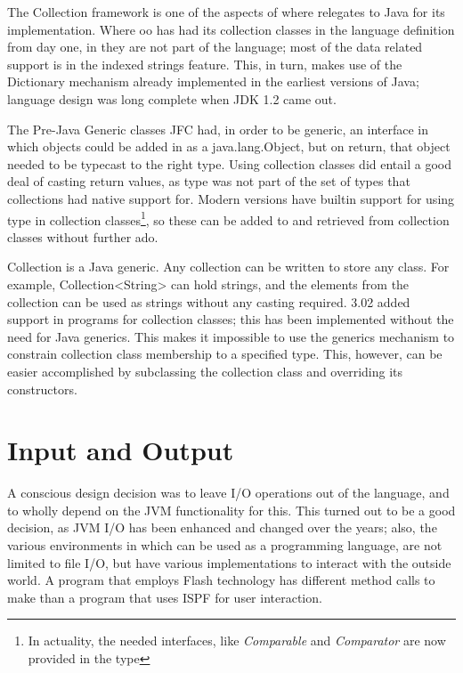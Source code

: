 The Collection framework is one of the aspects of where \nr{}
relegates to Java for its implementation. Where oo\Rexx{} has had its
collection classes in the language definition from day one, in \nr{}
they are not part of the language; most of the data related support is
in the indexed strings feature. This, in turn, makes use of the
Dictionary mechanism already implemented in the earliest versions of Java;
\nr{} language design was long complete when JDK 1.2 came out.

The Pre-Java Generic classes JFC had, in order to be generic, an
interface in which objects could be added in as a java.lang.Object,
but on return, that object needed to be typecast to the right type.
Using collection classes did entail a good deal of casting return
values, as type \Rexx{} was not part of the set of types that
collections had native support for. Modern \nr{} versions
 have builtin support for using type
\Rexx{} in collection classes\footnote{In actuality, the needed
  interfaces, like \emph{Comparable} and \emph{Comparator} are now
  provided in the \Rexx{} type}, so these can be added to and
retrieved from collection classes without further ado. 

\begin{shaded}
Collection is a Java generic. Any collection can be written to store any
class. For example, Collection<String> can hold strings, and the
elements from the collection can be used as strings without any
casting required. \nr{} 3.02 added  support in
\nr{} programs for collection classes; this has been implemented
without the need for Java generics. This makes it impossible to use
the generics mechanism to constrain collection class membership to a
specified type. This, however, can be easier accomplished by
subclassing the collection class and overriding its constructors.
\end{shaded}


 
\chapter{Input and Output}
A conscious design decision was to leave I/O operations out of the
language, and to wholly depend on the JVM functionality for this. This
turned out to be a good decision, as JVM I/O has been enhanced and
changed over the years; also, the various environments in which \nr{}
can be used as a programming language, are not limited to file I/O,
but have various implementations to interact with the outside world. A
\nr{} program that employs Flash technology has different method calls
to make than a program that uses ISPF for user interaction.

